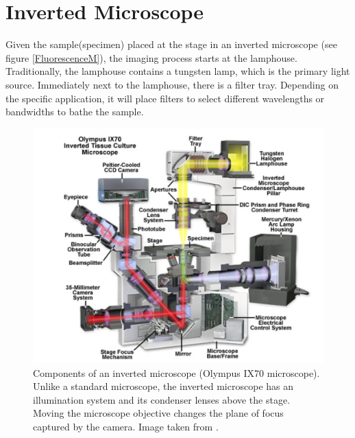 \documentclass[letterpaper,12pt,oneside]{book}
\begin{document}
\section{Inverted Microscope}
Given the sample(specimen) placed at the stage in an inverted microscope (see figure \ref{FluorescenceM}), the imaging process starts at the lamphouse. Traditionally, the lamphouse contains a tungsten lamp, which is the primary light source. Immediately next to the lamphouse, there is a filter tray. Depending on the specific application, it will place filters to select different wavelengths or bandwidths to bathe the sample. 
\begin{figure}[H]
    \centering
    \includegraphics[scale=0.55]{Microscopeinvertedtrain.png}
    \caption{Components of an inverted microscope (Olympus IX70 microscope). Unlike a standard microscope, the inverted microscope has an illumination system and its condenser lenses above the stage. Moving the microscope objective changes the plane of focus captured by the camera. Image taken from \cite{Fester_Davidson_Abramowitz}. \label{FluorescenceM}}
    \label{Microscope inverted}
\end{figure}
\end{document}
